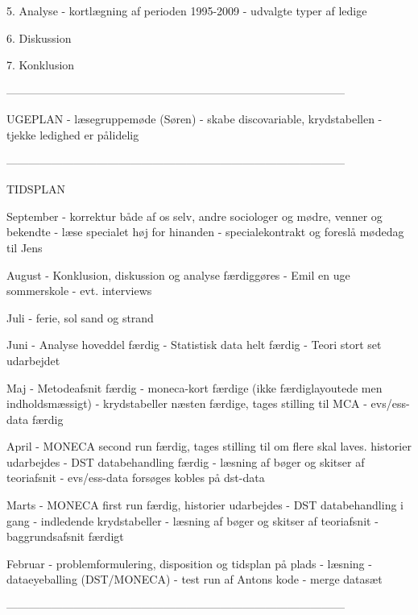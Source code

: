 5. Analyse
- kortlægning af perioden 1995-2009
- udvalgte typer af ledige

6. Diskussion

7. Konklusion



------------------------------------------------------------------------------------------

UGEPLAN
- læsegruppemøde (Søren)
- skabe discovariable, krydstabellen 
- tjekke ledighed er pålidelig 

------------------------------------------------------------------------------------------

TIDSPLAN

September
- korrektur både af os selv, andre sociologer og mødre, venner og bekendte
- læse specialet høj for hinanden
- specialekontrakt og foreslå mødedag til Jens

August
 - Konklusion, diskussion og analyse færdiggøres
 - Emil en uge sommerskole
 - evt. interviews

Juli 
- ferie, sol sand og strand 

Juni
- Analyse hoveddel færdig
- Statistisk data helt færdig
- Teori stort set udarbejdet

Maj
- Metodeafsnit færdig
- moneca-kort færdige (ikke færdiglayoutede men indholdsmæssigt)
- krydstabeller næsten færdige, tages stilling til MCA
- evs/ess-data færdig

April
- MONECA second run færdig, tages stilling til om flere skal laves. historier udarbejdes
- DST databehandling færdig
- læsning af bøger og skitser af teoriafsnit
- evs/ess-data forsøges kobles på dst-data

Marts
- MONECA first run færdig, historier udarbejdes
- DST databehandling i gang
- indledende krydstabeller
- læsning af bøger og skitser af teoriafsnit
- baggrundsafsnit færdigt

Februar
- problemformulering, disposition og tidsplan på plads
- læsning
- dataeyeballing (DST/MONECA)
- test run af Antons kode
- merge datasæt 

------------------------------------------------------------------------------------------


